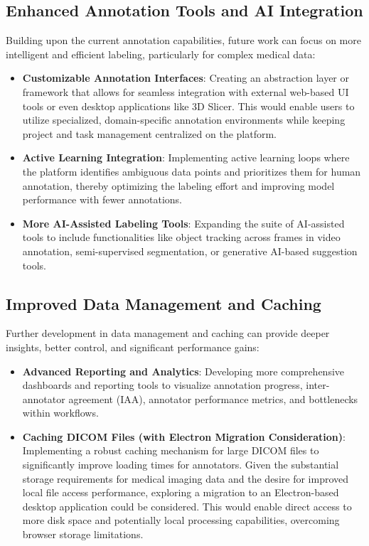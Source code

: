 \subsection{Enhanced Annotation Tools and AI Integration}
Building upon the current annotation capabilities, future work can focus on more intelligent and efficient labeling, particularly for complex medical data:
\begin{itemize}
    \item \textbf{Customizable Annotation Interfaces}: Creating an abstraction layer or framework that allows for seamless integration with external web-based UI tools or even desktop applications like 3D Slicer. This would enable users to utilize specialized, domain-specific annotation environments while keeping project and task management centralized on the platform.
    \item \textbf{Active Learning Integration}: Implementing active learning loops where the platform identifies ambiguous data points and prioritizes them for human annotation, thereby optimizing the labeling effort and improving model performance with fewer annotations.
    \item \textbf{More AI-Assisted Labeling Tools}: Expanding the suite of AI-assisted tools to include functionalities like object tracking across frames in video annotation, semi-supervised segmentation, or generative AI-based suggestion tools.
\end{itemize}

\subsection{Improved Data Management and Caching}
Further development in data management and caching can provide deeper insights, better control, and significant performance gains:
\begin{itemize}
    \item \textbf{Advanced Reporting and Analytics}: Developing more comprehensive dashboards and reporting tools to visualize annotation progress, inter-annotator agreement (IAA), annotator performance metrics, and bottlenecks within workflows.
    \item \textbf{Caching DICOM Files (with Electron Migration Consideration)}: Implementing a robust caching mechanism for large DICOM files to significantly improve loading times for annotators. Given the substantial storage requirements for medical imaging data and the desire for improved local file access performance, exploring a migration to an Electron-based desktop application could be considered. This would enable direct access to more disk space and potentially local processing capabilities, overcoming browser storage limitations.
\end{itemize}

